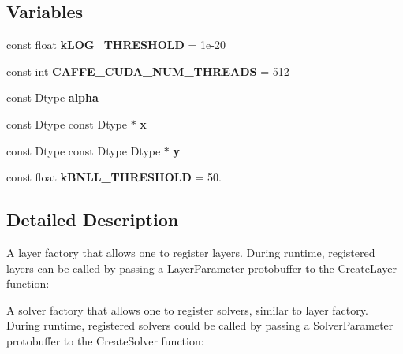 \subsection*{Variables}
\begin{DoxyCompactItemize}
\item 
const float {\bfseries k\+L\+O\+G\+\_\+\+T\+H\+R\+E\+S\+H\+O\+LD} = 1e-\/20\hypertarget{namespacecaffe_addfe87008440b3c5636d308f5189de6f}{}\label{namespacecaffe_addfe87008440b3c5636d308f5189de6f}

\item 
const int {\bfseries C\+A\+F\+F\+E\+\_\+\+C\+U\+D\+A\+\_\+\+N\+U\+M\+\_\+\+T\+H\+R\+E\+A\+DS} = 512\hypertarget{namespacecaffe_a10ad8f44dec37737a660d1d5439b9cca}{}\label{namespacecaffe_a10ad8f44dec37737a660d1d5439b9cca}

\item 
const Dtype {\bfseries alpha}\hypertarget{namespacecaffe_a32e3412526c6fa01d9ec08fc6866fb12}{}\label{namespacecaffe_a32e3412526c6fa01d9ec08fc6866fb12}

\item 
const Dtype const Dtype $\ast$ {\bfseries x}\hypertarget{namespacecaffe_a5ae8b4251a5cba81abd61499341870be}{}\label{namespacecaffe_a5ae8b4251a5cba81abd61499341870be}

\item 
const Dtype const Dtype Dtype $\ast$ {\bfseries y}\hypertarget{namespacecaffe_ab922408da6e0ba33ee7a334646b6c3b6}{}\label{namespacecaffe_ab922408da6e0ba33ee7a334646b6c3b6}

\item 
const float {\bfseries k\+B\+N\+L\+L\+\_\+\+T\+H\+R\+E\+S\+H\+O\+LD} = 50.\hypertarget{namespacecaffe_a01b89e7dac7d83e43840af4a4415589d}{}\label{namespacecaffe_a01b89e7dac7d83e43840af4a4415589d}

\end{DoxyCompactItemize}


\subsection{Detailed Description}
A layer factory that allows one to register layers. During runtime, registered layers can be called by passing a Layer\+Parameter protobuffer to the Create\+Layer function\+: 

A solver factory that allows one to register solvers, similar to layer factory. During runtime, registered solvers could be called by passing a Solver\+Parameter protobuffer to the Create\+Solver function\+:

